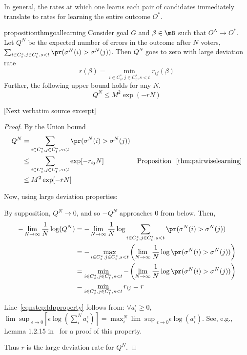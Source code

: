 \documentclass[10pt]{article}
\begin{document}
\begin{ReviewVerbatim}
In general, the rates at which one learns each pair of candidates immediately translate to rates for learning the entire outcome $O^*$.

\begin{restatable}{proposition}{thmgoallearning}
	\label{thm:goal_learning}
	Consider goal $G$ and $\beta\in\mB$ such that $O^N \to O^*$. Let $Q^N$ be the expected number of errors in the outcome after $N$ voters, $\sum_{i\in C_s^*,j\in C_t^*, s < t} \pr(\sigma^N(i)>\sigma^N(j))$. Then $Q^N$ goes to zero with large deviation rate
%
	\[
	r(\beta) = \min_{i\in C_s^*,j\in C_t^*, s < t} r_{ij}(\beta) \label{eqnpart:outcomerate}
	\]
	Further, the following upper bound holds for any $N$. \[Q^N \leq M^2 \exp(-rN)\] %
%
%
%

%
\end{restatable}

[Next verbatim source excerpt]

\thmgoallearning*
\begin{proof}
%
%

By the Union bound
\begin{align*}
%
Q^N &= \sum_{i\in C_s^*,j\in C_t^*, s < t} \pr(\sigma^N(i) > \sigma^N(j)) \\
%
&\leq \sum_{i\in C_s^*,j\in C_t^*, s < t} \exp[-r_{ij}N] & \text{Proposition }~\ref{thm:pairwiselearning}\\
&\leq M^2  \exp[-rN]\\
%
%
%
%
%
%
\end{align*}

%
Now, using large deviation properties:

%
By supposition, $Q^N \to 0$, and so $-Q^N$ approaches $0$ from below.
%
Then,
\begin{align}
%
-\lim_{N\to\infty} \frac{1}{N}\log(Q^N)
&=  -\lim_{N\to\infty} \frac{1}{N}\log \sum_{i\in C_s^*,j\in C_t^*, s < t} \pr(\sigma^N(i) > \sigma^N(j))\nonumber\\
&= -\max_{i\in C_s^*,j\in C_t^*, s < t}\left(\lim_{N\to\infty} \frac{1}{N}\log \pr(\sigma^N(i) > \sigma^N(j))\right)\label{eqnstep:ldpproperty}\\
&= \min_{i\in C_s^*,j\in C_t^*, s < t}-\left(\lim_{N\to\infty} \frac{1}{N}\log \pr(\sigma^N(i) > \sigma^N(j))\right)\nonumber\\
&= \min_{i\in C_s^*,j\in C_t^*, s < t} r_{ij} = r\nonumber
\end{align}

Line~\eqref{eqnstep:ldpproperty} follows from: $\forall a^\epsilon_i \geq 0$, ${\lim \sup}_{\epsilon \to 0} \left[\epsilon\log\left(\sum_i^N a^\epsilon_i\right)\right] = \max^N_i {\lim \sup}_{\epsilon \to 0} \epsilon \log(a^\epsilon_i)$.
See, e.g., Lemma 1.2.15 in~\cite{dembo_large_2010} for a proof of this property.

Thus $r$ is the large deviation rate for $Q^N$.

\end{proof}
\end{ReviewVerbatim}
\end{document}
